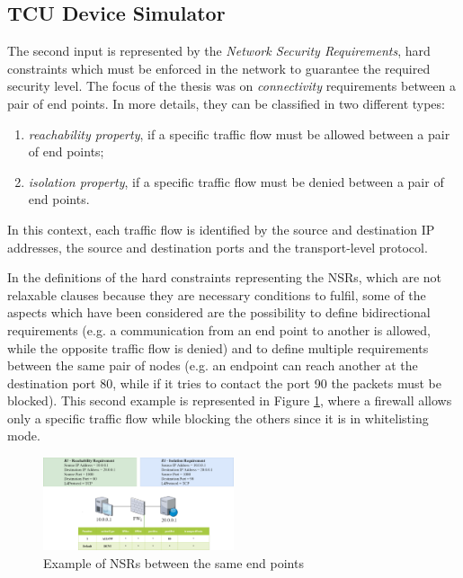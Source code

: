 \documentclass[10pt,a4paper,roman, twocolumn]{article}
\begin{document}
\subsection{TCU Device Simulator}

The second input is represented by the \textit{Network Security Requirements}, hard constraints which must be enforced in the network to guarantee the required security level. The focus of the thesis was on \textit{connectivity} requirements between a pair of end points. In more details, they can be classified in two different types: 
\begin{enumerate}
\setlength\itemsep{-0.3em}
\item \textit{reachability property}, if a specific traffic flow must be allowed between a pair of end points;
\item \textit{isolation property}, if a specific traffic flow must be denied between a pair of end points.
\end{enumerate}
In this context, each traffic flow is identified by the source and destination IP addresses, the source and destination ports and the transport-level protocol.

In the definitions of the hard constraints representing the NSRs, which are not relaxable clauses because they are necessary conditions to fulfil, some of the aspects which have been considered are the possibility to define bidirectional requirements (e.g. a communication from an end point to another is allowed, while the opposite traffic flow is denied) and to define multiple requirements between the same pair of nodes (e.g. an endpoint can reach another at the destination port 80, while if it tries to contact the port 90 the packets must be blocked). This second example is represented in Figure \ref{fig:multiple03}, where a firewall allows only a specific traffic flow while blocking the others since it is in whitelisting mode.

\begin{figure}[tbh]
	\centerline{\includegraphics[width=0.5\textwidth]{images/multiple.png}}
	\caption{Example of NSRs between the same end points}
	\label{fig:multiple03}
\end{figure}
\end{document}
